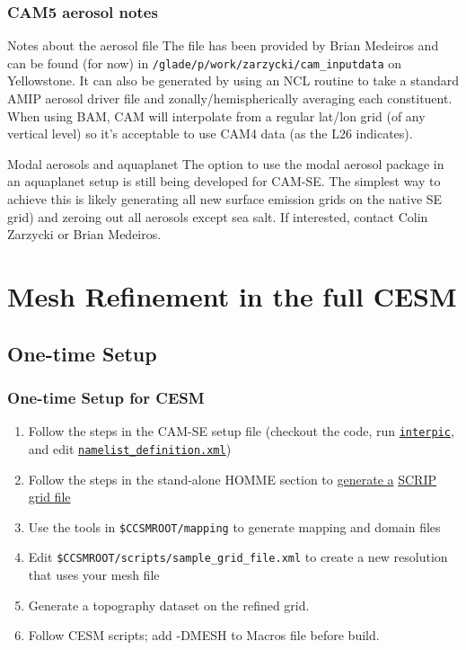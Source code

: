 \documentclass{beamer}
\newcommand{\interpic}{\hyperlink{interpic}{\texttt{interpic}}}
\newcommand{\namelist}{\hyperlink{namelist}{\texttt{namelist\_definition.xml}}}
\begin{document}
%
\begin{frame}[containsverbatim]
\frametitle{CAM5 aerosol notes}
\begin{block}{Notes about the aerosol file}
The file has been provided by Brian Medeiros and can be found (for now) in \verb|/glade/p/work/zarzycki/cam_inputdata| on Yellowstone. It can also be generated by using an NCL routine to take a standard AMIP aerosol driver file and zonally/hemispherically averaging each constituent. When using BAM, CAM will interpolate from a regular lat/lon grid (of any vertical level) so it's acceptable to use CAM4 data (as the L26 indicates).
\end{block}
\begin{block}{Modal aerosols and aquaplanet}
The option to use the modal aerosol package in an aquaplanet setup is still being developed for CAM-SE. The simplest way to achieve this is likely generating all new surface emission grids on the native SE grid) and zeroing out all aerosols except sea salt. If interested, contact Colin Zarzycki or Brian Medeiros.
\end{block}
\end{frame}
%
\section{Mesh Refinement in the full CESM}
\subsection{One-time Setup}
\begin{frame}[containsverbatim]
\frametitle{One-time Setup for CESM}
\begin{block}{}
\begin{enumerate}
\item Follow the steps in the CAM-SE setup file (checkout the code, run \interpic, and edit \namelist)
\item Follow the steps in the stand-alone HOMME section to \hyperlink{scrip}{generate a} \hyperlink{scrip}{SCRIP grid file}
\item Use the tools in \verb|$CCSMROOT/mapping| to generate mapping and domain files
\item Edit \verb|$CCSMROOT/scripts/sample_grid_file.xml| to create a new resolution that uses your mesh file
\item Generate a topography dataset on the refined grid.
\item Follow CESM scripts; add -DMESH to Macros file before build.
\end{enumerate}
\end{block}
\end{frame}
%
\end{document}
